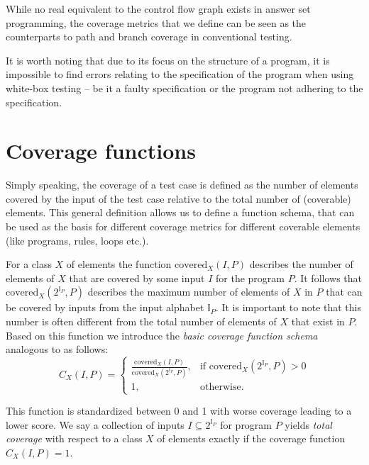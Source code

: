 While no real equivalent to the control flow graph exists in answer set programming, the coverage metrics that we define can be seen as the counterparts to path and branch coverage in conventional testing.

It is worth noting that due to its focus on the structure of a program, it is impossible to find errors relating to the specification of the program when using white-box testing -- be it a faulty specification or the program not adhering to the specification.


\section{Coverage functions}
\label{sec:Coverage metrics/Coverage functions}
Simply speaking, the coverage of a test case is defined as the number of elements covered by the input of the test case relative to the total number of (coverable) elements. This general definition allows us to define a function schema, that can be used as the basis for different coverage metrics for different coverable elements (like programs, rules, loops etc.). 

For a class $X$ of elements the function \(\text{covered}_X(I, P)\) describes the number of elements of $X$ that are covered by some input $I$ for the program $P$. It follows that \(\text{covered}_X(2^{\mathbb{I}_P}, P)\) describes the maximum number of elements of $X$ in $P$ that can be covered by inputs from the input alphabet \(\mathbb{I}_P\). It is important to note that this number is often different from the total number of elements of $X$ that exist in $P$. Based on this function we introduce the \emph{basic coverage function schema} analogous to \cite{Jan+10} as follows:
\begin{equation}
\label{eq:coverage function schema}
    C_X(I, P) = 
    \begin{cases}
        \frac{\text{covered}_X(I, P)}{\text{covered}_X(2^{\mathbb{I}_P}, P)}, & \text{if covered}_X(2^{\mathbb{I}_P}, P) > 0 \\
        1, & \text{otherwise.}
    \end{cases}
\end{equation}

This function is standardized between 0 and 1 with worse coverage leading to a lower score. We say a collection of inputs \(I \subseteq 2^{\mathbb{I}_P}\) for program $P$ yields \emph{total coverage} with respect to a class $X$ of elements exactly if the coverage function $C_X(I, P) = 1$.

